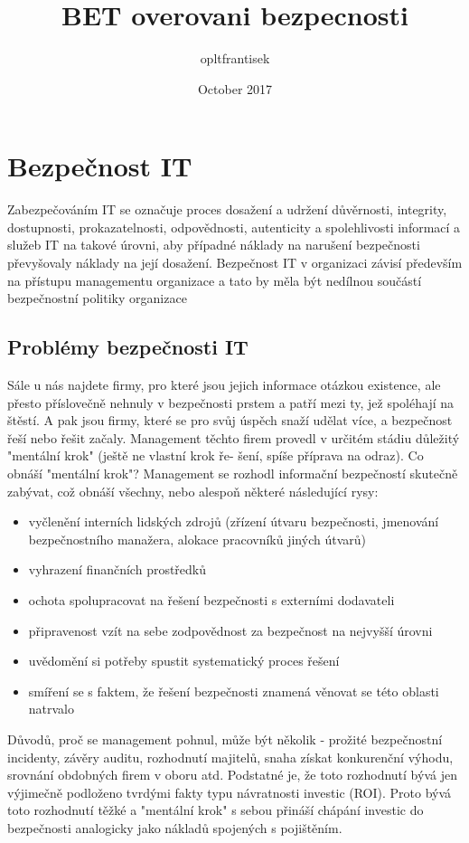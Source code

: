 \documentclass{article}
\title{BET overovani bezpecnosti}
\author{opltfrantisek }
\date{October 2017}
\begin{document}
 

\maketitle
\section{Bezpečnost IT}
Zabezpečováním IT se označuje proces dosažení a udržení důvěrnosti, integrity, dostupnosti,
prokazatelnosti, odpovědnosti, autenticity a spolehlivosti informací a služeb IT na takové úrovni, aby
případné náklady na narušení bezpečnosti převyšovaly náklady na její dosažení. Bezpečnost IT v organizaci
závisí především na přístupu managementu organizace a tato by měla být nedílnou součástí
bezpečnostní politiky organizace
\subsection{Problémy bezpečnosti IT}
 Sále u nás najdete firmy,
pro které jsou jejich informace otázkou existence, ale přesto příslovečně nehnuly v bezpečnosti
prstem a patří mezi ty, jež spoléhají na štěstí.
A pak jsou firmy, které se pro svůj úspěch snaží udělat více, a bezpečnost řeší nebo řešit začaly.
Management těchto firem provedl v určitém stádiu důležitý "mentální krok" (ještě ne vlastní krok ře-
šení, spíše příprava na odraz).
Co obnáší "mentální krok"? Management se rozhodl informační bezpečností skutečně zabývat,
což obnáší všechny, nebo alespoň některé následující rysy:
\begin{itemize}
    \item vyčlenění interních lidských zdrojů (zřízení útvaru bezpečnosti, jmenování bezpečnostního
manažera, alokace pracovníků jiných útvarů)
    \item vyhrazení finančních prostředků
    \item ochota spolupracovat na řešení bezpečnosti s externími dodavateli
    \item připravenost vzít na sebe zodpovědnost za bezpečnost na nejvyšší úrovni
    \item uvědomění si potřeby spustit systematický proces řešení
    \item smíření se s faktem, že řešení bezpečnosti znamená věnovat se této oblasti natrvalo
\end{itemize}
Důvodů, proč se management pohnul, může být několik - prožité bezpečnostní incidenty,
závěry auditu, rozhodnutí majitelů, snaha získat konkurenční
výhodu, srovnání obdobných firem v oboru atd. Podstatné je, že toto rozhodnutí bývá jen výjimečně
podloženo tvrdými fakty typu návratnosti investic (ROI). Proto bývá toto rozhodnutí těžké
a "mentální krok" s sebou přináší chápání investic do bezpečnosti analogicky jako nákladů spojených
s pojištěním.
\end{document}
